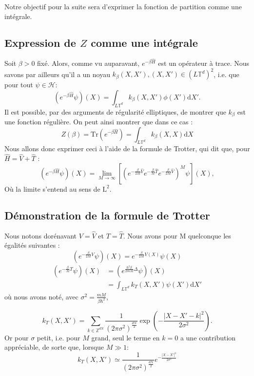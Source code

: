 \documentclass[11pt]{article}
\newcommand{\hham}{\hat{H}}
\newcommand{\dom}{L\mathbb{T}^d}
\begin{document}
Notre objectif pour la suite sera d'exprimer la fonction de partition comme une intégrale.
\subsection{Expression de $Z$ comme une intégrale}
Soit $\beta>0$ fixé. Alors, comme vu auparavant, $e^{-\beta\hham}$ est un opérateur à trace. Nous savons par ailleurs qu'il a un noyau $k_{\beta}(X,X'), (X,X')\in(\dom)^2$, i.e. que pour tout $\psi\in \mathcal{H}$:
\begin{equation}
(e^{-\beta \hham}\psi)(X)=\int_{\dom} k_{\beta}(X,X')\phi(X')\mathrm{d}X'.
\end{equation}
Il est possible, par des arguments de régularité elliptiques, de montrer que $k_\beta$ est une fonction régulière.
On peut ainsi montrer que dans ce cas :
\begin{equation}
Z(\beta)=\mathrm{Tr}(e^{-\beta \hham})=\int_{\dom}k_\beta(X,X)\mathrm{d}X
\end{equation}
Nous allons donc exprimer ceci à l'aide de la formule de Trotter, qui dit que, pour $\hham=\hat{V}+\hat{T}$ :
\begin{equation}
(e^{-\beta \hham}\psi)(X)=\lim_{M\to \infty}\left[(e^{-\frac{\beta}{2M}\hat{V}}e^{-\frac{\beta}{M}\hat{T}}e^{-\frac{\beta}{2M}\hat{V}})^M\psi\right](X),
\end{equation}
Où la limite s'entend au sens de $\mathrm{L}^2$. 

\subsection{Démonstration de la formule de Trotter}
Nous notons dorénavant $V=\hat{V}$ et $T=\hat{T}$.
Nous avons pour M quelconque les égalités suivantes : 
\begin{equation}
(e^{-\frac{\beta}{2M}V}\psi)(X)=e^{-\frac{\beta}{2M}V(X)}\psi(X)
\end{equation}
\begin{align}
(e^{-\frac{\beta}{M}T}\psi)(X)&=(e^{\frac{\hbar^2\beta}{2mM}\Delta}\psi)(X)\\
&=\int_{\dom}k_T(X,X')\psi(X')\mathrm{d}X'
\end{align}
où nous avons noté, avec $\sigma^2=\frac{mM}{\beta \hbar^2}$, 

\begin{equation}
k_T(X,X')=\sum_{k\in\mathbb{Z}^{dN}}\frac{1}{(2\pi\sigma^2)^{\frac{dN}{2}}}\exp\left(-\frac{|X-X'-k|^2}{2\sigma^2}\right).
\end{equation}
Or pour $\sigma$ petit, i.e. pour $M$ grand, seul le terme en $k=0$ a une contribution appréciable, de sorte que, lorsque $M\gg 1$: 
\begin{equation}
k_T(X,X')\simeq\frac{1}{(2\pi\sigma^2)^{\frac{dN}{2}}}e^{-\frac{|X-X'|^2}{2\sigma^2}}
\end{equation}
\end{document}

